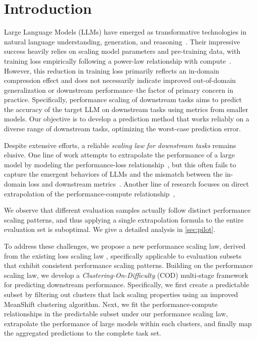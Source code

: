 \vspace{-7pt}
\section{Introduction}
\label{sec:intro}
Large Language Models (LLMs) have emerged as transformative technologies in natural language understanding, generation, and reasoning~\citep{achiam2023gpt, guo2025deepseek, bubeck2023sparks}. Their impressive success heavily relies on scaling model parameters and pre-training data, with training loss empirically following a power-law relationship with compute~\citep{hoffmann2022training, kaplan2020scaling}. However, this reduction in training loss primarily reflects an in-domain compression effect and does not necessarily indicate improved out-of-domain generalization or downstream performance--the factor of primary concern in practice. Specifically, performance scaling of downstream tasks aims to predict the accuracy of the target LLM on downstream tasks using metrics from smaller models. Our objective is to develop a prediction method that works reliably on a diverse range of downstream tasks, optimizing the worst-case prediction error.

Despite extensive efforts, a reliable \textit{scaling law for downstream tasks} remains elusive. One line of work attempts to extrapolate the performance of a large model by modeling the performance-loss relationship~\citep{chen2024scaling,gadre2024language,du2024understanding,xiao2024densing,owen2024predictable}, but this often fails to capture the emergent behaviors of LLMs and the mismatch between the in-domain loss and downstream metrics~\citep{zhang2021understanding}. Another line of research focuses on direct extrapolation of the performance-compute relationship~\citep{achiam2023gpt,hu2023predicting}, 

 We observe that different evaluation samples actually follow distinct performance scaling patterns, and thus applying a single extrapolation formula to the entire evaluation set is suboptimal. We give a detailed analysis in \cref{sec:pilot}.

To address these challenges, we propose a new performance scaling law, derived from the existing loss scaling law \citep{kaplan2020scaling}, specifically applicable to evaluation subsets that exhibit consistent performance scaling patterns. Building on the performance scaling law, we develop a \textit{Clustering-On-Difficulty} (COD) multi-stage framework for predicting downstream performance. Specifically, we first create a predictable subset by filtering out clusters that lack scaling properties using an improved MeanShift clustering algorithm. Next, we fit the performance-compute relationships in the predictable subset under our performance scaling law, extrapolate the performance of large models within each clusters, and finally map the aggregated predictions to the complete task set.

